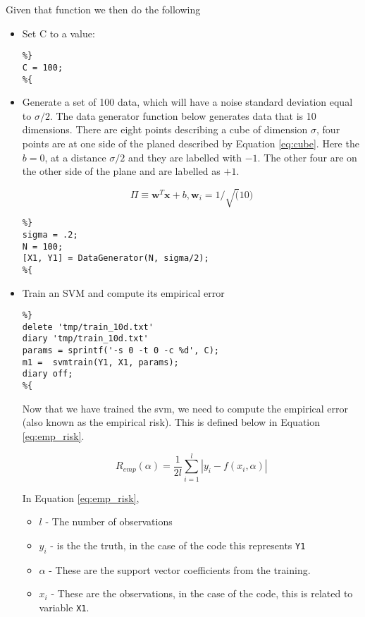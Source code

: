\documentclass[11pt, twoside]{article}   	%
\begin{document}
Given that function we then do the following
\begin{itemize}
\item Set C to a value: 
\begin{lstlisting}
%}
C = 100; 
%{
\end{lstlisting}
\item Generate a set of 100 data, which will have a noise standard
deviation equal to $\sigma/2$. The data generator function below generates
data that is 10 dimensions. There are eight points describing a cube 
of dimension $\sigma$, four points are at one side of the planed described by
Equation \ref{eq:cube}. Here the $b=0$, at a distance $\sigma/2$ and they are
labelled with $-1$. The other four are on the other side of the plane and are labelled
as $+1$. 

\begin{equation}
\Pi \equiv \mathbf{w}^T\mathbf{x} + b , \mathbf{w}_i = 1/\sqrt(10)
\label{eq:cube}
\end{equation}
 
\begin{lstlisting}
%}
sigma = .2; 
N = 100; 
[X1, Y1] = DataGenerator(N, sigma/2); 
%{
\end{lstlisting}  

\item Train an SVM and compute its empirical error
\begin{lstlisting}
%}
delete 'tmp/train_10d.txt'
diary 'tmp/train_10d.txt'
params = sprintf('-s 0 -t 0 -c %d', C); 
m1 =  svmtrain(Y1, X1, params);
diary off; 
%{
\end{lstlisting} 

\color{lightgray}
\color{black}

Now that we have trained the svm, we need to compute the empirical error (also known as the
empirical risk). This is defined below in Equation \ref{eq:emp_risk}. 

\begin{equation}
R_{emp}(\alpha) = \frac{1}{2l} \sum\limits_{i=1}^l|y_i - f(x_i, \alpha)|
\label{eq:emp_risk}
\end{equation}

In Equation \ref{eq:emp_risk},
\begin{itemize}
\item $l$ - The number of observations
\item $y_i$ - is the the truth, in the case of the code this represents 
\texttt{Y1}
\item $\alpha$ - These are the support vector coefficients from the
training. 
\item $x_i$ - These are the observations, in the case of the code, this is
related to variable \texttt{X1}. 
\end{itemize}


\end{itemize}
\end{document}
